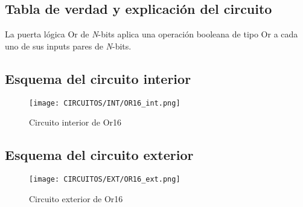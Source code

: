 \documentclass[12pt]{article}
\begin{document}
    \subsection{Tabla de verdad y explicación del circuito}
    La puerta lógica Or de \textit{N}-bits aplica una operación booleana de tipo Or a cada uno de sus inputs pares de \textit{N}-bits. \cite{nisan_nand2tetris_2005}
        \begin{table}[H]
        \centering
        \caption{Tabla de verdad de OR16}
        \label{tab:tab_or16}
        \end{table}
        
    \subsection{Esquema del circuito interior}
        \begin{figure}[H]
            \centering
            \texttt{[image: CIRCUITOS/INT/OR16\_int.png]}
            \caption{Circuito interior de Or16 \cite{circuitverse}}
            \label{fig:or16_int}
        \end{figure}
    \subsection{Esquema del circuito exterior}
        \begin{figure}[H]
            \centering
            \texttt{[image: CIRCUITOS/EXT/OR16\_ext.png]}
            \caption{Circuito exterior de Or16 \cite{circuitverse}}
            \label{fig:or16_ext}
        \end{figure}
\end{document}
